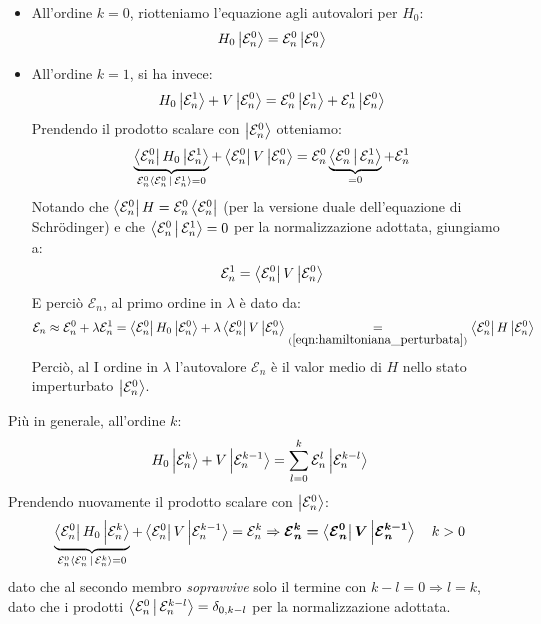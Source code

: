 \documentclass[../../FisicaTeorica.tex]{subfiles}
\begin{document}
\begin{itemize}
\item All'ordine $k=0$, riotteniamo l'equazione agli autovalori per $H_0$:
\begin{align*}
H_0 \Ket{\mathcal{E}_n^0} = \mathcal{E}_n^0 \Ket{\mathcal{E}_n^0}
\end{align*}
\item All'ordine $k=1$, si ha invece:
\begin{align*}
H_0 \Ket{\mathcal{E}^1_n} + V \Ket{\mathcal{E}^0_n} = \mathcal{E}^0_n \Ket{\mathcal{E}^1_n} + \mathcal{E}^1_n
 \Ket{\mathcal{E}^0_n}\end{align*}
Prendendo il prodotto scalare con $\Ket{\mathcal{E}_n^0}$ otteniamo:
\begin{align*}
\underbrace{\Bra{\mathcal{E}^0_n} H_0 \Ket{\mathcal{E}^1_n}}_{\mathcal{E}_n^0 \Braket{\mathcal{E}^0_n|\mathcal{E}^1_n}=0} + \Bra{\mathcal{E}^0_n}V \Ket{\mathcal{E}^0_n} = \mathcal{E}_n^0\underbrace{ \Braket{\mathcal{E}^0_n | \mathcal{E}^1_n}}_{=0} + \mathcal{E}^1_n
\end{align*}
Notando che $\Bra{\mathcal{E}_n^0}H=\mathcal{E}_n^0\Bra{\mathcal{E}_n^0}$ (per la versione duale dell'equazione di Schr\"odinger) e che $\Braket{\mathcal{E}_n^0|\mathcal{E}_n^1}=0$ per la normalizzazione adottata, giungiamo a:
\begin{align*}
\mathcal{E}_n^1 = \Bra{\mathcal{E}_n^0} V \Ket{\mathcal{E}^0_n}
\end{align*}
E perciò $\mathcal{E}_n$, al primo ordine in $\lambda$ è dato da:
\begin{align*}
\mathcal{E}_n \approx \mathcal{E}_n^0 + \lambda \mathcal{E}_n^1 = \Bra{\mathcal{E}_n^0}H_0\Ket{\mathcal{E}_n^0}
+ \lambda \Bra{\mathcal{E}^0_n}V\Ket{\mathcal{E}^0_n} \underset{(\ref{eqn:hamiltoniana_perturbata})}{=} \Bra{\mathcal{E}^0_n}H \Ket{\mathcal{E}^0_n}
\end{align*}
Perciò, al I ordine in $\lambda$ l'autovalore $\mathcal{E}_n$ è il valor medio di $H$ nello stato imperturbato $\Ket{\mathcal{E}^0_n}$.\\

\end{itemize}


Più in generale, all'ordine $k$:
\begin{align}
H_0 \Ket{\mathcal{E}^k_n} + V\Ket{\mathcal{E}^{k-1}_n} = \sum_{l=0}^k \mathcal{E}^l_n \Ket{\mathcal{E}^{k-l}_n}
\label{eqn:termine-l}
\end{align}
Prendendo nuovamente il prodotto scalare con $\Ket{\mathcal{E}^0_n}$: 
\begin{align}
\underbrace{\Bra{\mathcal{E}^0_n} H_0 \Ket{\mathcal{E}^k_n}}_{\mathcal{E}_n^0 \Braket{\mathcal{E}_n^0 | \mathcal{E}^k_n} =0} + 
\Bra{\mathcal{E}^{0}_n}V\Ket{\mathcal{E}^{k-1}_n} = \mathcal{E}^k_n \Rightarrow \bm{\mathcal{E}_n^k = \Bra{\mathcal{E}_n^0}V\Ket{\mathcal{E}_n^{k-1}}}\quad k>0
\label{enk_val_final}
\end{align}
dato che al secondo membro \textit{sopravvive} solo il termine con $k-l=0\Rightarrow l=k$, dato che i prodotti $\Braket{\mathcal{E}_n^0|\mathcal{E}_n^{k-l}} = \delta_{0,k-l}$ per la normalizzazione adottata.\\
\end{document}
